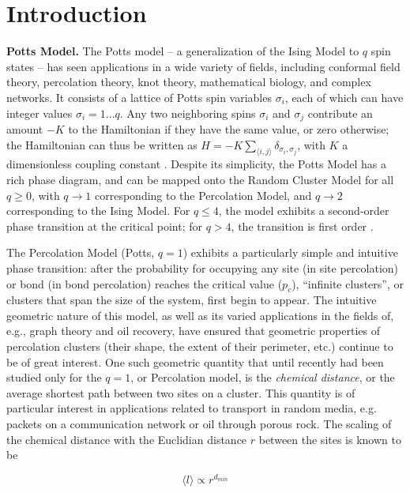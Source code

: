 \documentclass[pre,preprint,11pt]{revtex4}
\newcommand{\lb}{{\langle}}
\newcommand{\rb}{{\rangle}}
\begin{document}
\section{Introduction}

{\bf Potts Model.} The Potts model -- a generalization of the Ising Model to $q$ spin states -- has seen applications in a wide variety of fields, including conformal field theory, percolation theory, knot theory, mathematical biology, and complex networks. It consists of a lattice of Potts spin variables $ \sigma_i $, each of which can have integer values $\sigma_i = 1 ... q$.  Any two neighboring spins $ \sigma_i $ and $ \sigma_j$ contribute an amount $-K$ to the Hamiltonian if they have the same value, or zero otherwise; the Hamiltonian can thus be written as $H=-K \displaystyle\sum_{\lb i,j \rb} \delta_{\sigma_i, \sigma_j}$, with $K$ a dimensionless coupling constant \cite{Wu82}.  Despite its simplicity, the Potts Model has a rich phase diagram, and can be mapped onto the Random Cluster Model for all $q \ge 0$, with  $q \to 1$ corresponding to the Percolation Model, and $q \to 2$ corresponding to the Ising Model.  For $q \le 4$, the model exhibits a second-order phase transition at the critical point; for $q>4$, the transition is first order \cite{Bax}. 

The Percolation Model (Potts, $q=1$) exhibits a particularly simple and intuitive phase transition:  after the probability for occupying any site (in site percolation) or bond (in bond percolation) reaches the critical value ($p_c$), ``infinite clusters'', or clusters that span the size of the system, first begin to appear.  The intuitive geometric nature of this model, as well as its varied applications in the fields of, e.g., graph theory and oil recovery, have ensured that geometric properties of percolation clusters (their shape, the extent of their perimeter, etc.) continue to be of great interest.  One such geometric quantity that until recently \cite{Deng2010} had been studied only for the $q = 1$, or Percolation model, is the {\it chemical distance}, or the average shortest path between two sites on a cluster.  This quantity is of particular interest in applications related to transport in random media, e.g. packets on a communication network or oil through porous rock. The scaling of the chemical distance with the Euclidian distance $r$ between the sites is known to be 

\begin{equation}
\lb l \rb \propto r^{d_{min}}
\end{equation}
\end{document}
